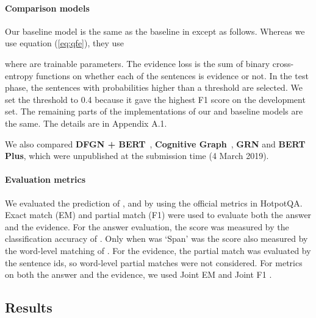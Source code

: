\documentclass[11pt,a4paper]{article}
\theoremstyle{definition}
\begin{document}
    \paragraph{Comparison models}
    	Our baseline model is the same as the baseline in \citet{hotpot} except as follows. Whereas we use equation (\ref{eq:qfe}), they use
	
	where  are trainable parameters. The evidence loss  is the sum of binary cross-entropy functions on whether each of the sentences is evidence or not. In the test phase, the sentences with probabilities higher than a threshold are selected. We set the threshold to 0.4 because it gave the highest F1 score on the development set.
	The remaining parts of the implementations of our and baseline models are the same. The details are in Appendix A.1.	
	
	We also compared \textbf{DFGN + BERT}~\cite{dfgn}, \textbf{Cognitive Graph}~\cite{cognotive_graph}, \textbf{GRN} and \textbf{BERT Plus}, which were unpublished at the submission time (4 March 2019).
	
	\paragraph{Evaluation metrics}
	We evaluated the prediction of ,  and  by using the official metrics in HotpotQA. Exact match (EM) and partial match (F1) were used to evaluate both the answer and the evidence. 
	For the answer evaluation, 
	the score was measured by the classification accuracy of .
	Only when  was `Span' was the score also measured by the word-level matching of .
	For the evidence, the partial match was evaluated by the sentence ids, 
	so word-level partial matches were not considered.
	For metrics on both the answer and the evidence,
	we used Joint EM and Joint F1 \cite{hotpot}.
	
	\subsection{Results}
	
\end{document}
